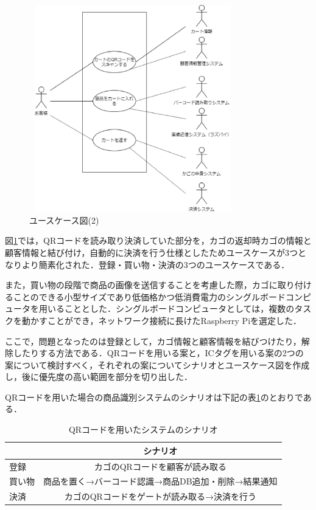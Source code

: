 \begin{figure}[htbp]
\centering
\includegraphics[height = 9cm,width = 9cm]{./picture/usecase3.eps}
\caption{ユースケース図(2)}
\label{usecase3}
\end{figure}


図\ref{usecase3}では，QRコードを読み取り決済していた部分を，カゴの返却時カゴの情報と顧客情報と結び付け，自動的に決済を行う仕様としたためユースケースが3つとなりより簡素化された．登録・買い物・決済の3つのユースケースである．

また，買い物の段階で商品の画像を送信することを考慮した際，カゴに取り付けることのできる小型サイズであり低価格かつ低消費電力のシングルボードコンピュータを用いることとした．シングルボードコンピュータとしては，複数のタスクを動かすことができ，ネットワーク接続に長けたRaspberry Piを選定した．

ここで，問題となったのは登録として，カゴ情報と顧客情報を結びつけたり，解除したりする方法である．QRコードを用いる案と，ICタグを用いる案の2つの案について検討すべく，それぞれの案についてシナリオとユースケース図を作成し，後に優先度の高い範囲を部分を切り出した．


QRコードを用いた場合の商品識別システムのシナリオは下記の表\ref{sina_qr}のとおりである．


\begin{table}[htb]
\begin{center}
\caption{QRコードを用いたシステムのシナリオ}
\begin{tabular}{|l|c|} \hline
 & シナリオ \\ \hline \hline
登録 & カゴのQRコードを顧客が読み取る \\
買い物 & 商品を置く→バーコード認識→商品DB追加・削除→結果通知 \\
決済 & カゴのQRコードをゲートが読み取る→決済を行う \\ \hline
\end{tabular}
\label{sina_qr}
\end{center}
\end{table}

